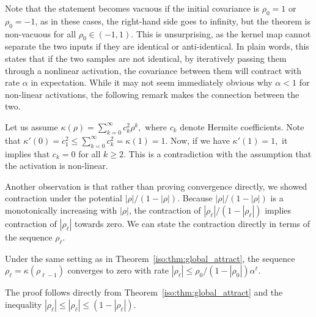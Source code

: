 Note that the statement becomes vacuous if the initial covariance is $\rho_0 = 1$ or $\rho_0 = -1$, as in these cases, the right-hand side goes to infinity, but the theorem is non-vacuous for all $\rho_0\in(-1,1).$ This is unsurprising, as the kernel map cannot separate the two inputs if they are identical or anti-identical. In plain words, this states that if the two samples are not identical, by iteratively passing them through a nonlinear activation, the covariance between them will contract with rate $\alpha$ in expectation.  While it may not seem immediately obvious why $\alpha < 1$ for non-linear activations, the following remark makes the connection between the two.

\begin{remark}
    \label{iso:rem:contraction_rate}
    Let us assume $\kappa(\rho)=\sum_{k=0}^\infty c_k^2\rho^k,$ where $c_k$ denote Hermite coefficients. Note that $\kappa'(0) = c_1^2 \le \sum_{k=0}^\infty c_k^2 = \kappa(1)=1$. Now, if we have $\kappa'(1)=1,$ it implies that $c_k=0$ for all $k\ge 2.$ This is a contradiction with the assumption that the activation is non-linear.  
\end{remark}


Another observation is that rather than proving convergence directly, we showed contraction under the potential $|\rho|/(1-|\rho|).$ Because $|\rho|/(1-|\rho|)$ is a monotonically increasing with $|\rho|$, the contraction of $|\rho_\ell|/(1-|\rho_\ell|)$ implies contraction of $|\rho_\ell|$ towards zero. We can state the contraction directly in terms of the sequence $\rho_\ell $.

\begin{corollary}
Under the same setting as in Theorem~\ref{iso:thm:global_attract}, the sequence $\rho_\ell = \kappa(\rho_{\ell-1})$ converges to zero with rate $|\rho_\ell| \le \rho_0/(1-|\rho_0|) \alpha^{\ell}$.
\end{corollary}

The proof follows directly from Theorem~\ref{iso:thm:global_attract} and the inequality $|\rho_\ell| \le |\rho_\ell|\le (1-|\rho_\ell|).$ 




